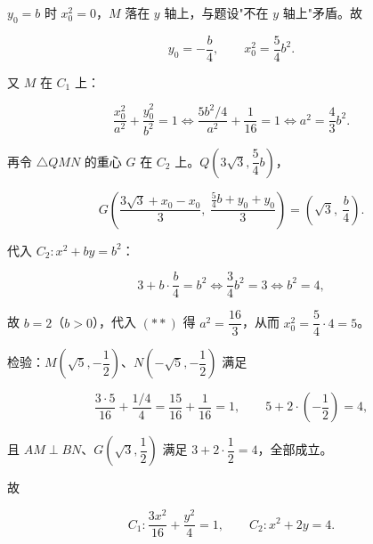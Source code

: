 \begin{answer}
$y_0=b$ 时 $x_0^2=0$，$M$ 落在 $y$ 轴上，与题设"不在 $y$ 轴上"矛盾。故

\nopagebreak[4]
\[y_0=-\frac b4,\qquad x_0^2=\frac54b^2.\]

又 $M$ 在 $C_1$ 上：

\nopagebreak[4]
\[\frac{x_0^2}{a^2}+\frac{y_0^2}{b^2}=1
\iff \frac{5b^2/4}{a^2}+\frac1{16}=1
\iff a^2=\frac43b^2.\tag{$**$}\]

再令 $\triangle QMN$ 的重心 $G$ 在 $C_2$ 上。$Q\left(3\sqrt3,\dfrac54b\right)$，

\nopagebreak[4]
\[G\left(\frac{3\sqrt3+x_0-x_0}3,\ \frac{\frac54b+y_0+y_0}3\right)
=\left(\sqrt3,\ \frac b4\right).\]

代入 $C_2:x^2+by=b^2$：

\nopagebreak[4]
\[3+b\cdot\frac b4=b^2\iff \frac34b^2=3\iff b^2=4,\]

故 $b=2$（$b>0$），代入 $(**)$ 得 $a^2=\dfrac{16}3$，从而 $x_0^2=\dfrac54\cdot4=5$。

检验：$M\left(\sqrt5,-\dfrac12\right)$、$N\left(-\sqrt5,-\dfrac12\right)$ 满足

\nopagebreak[4]
\[\frac{3\cdot5}{16}+\frac{1/4}{4}=\frac{15}{16}+\frac1{16}=1,\qquad
5+2\cdot\left(-\frac12\right)=4,\]

且 $AM\perp BN$、$G\left(\sqrt3,\dfrac12\right)$ 满足 $3+2\cdot\dfrac12=4$，全部成立。

故

\nopagebreak[4]
\[C_1:\frac{3x^2}{16}+\frac{y^2}{4}=1,\qquad C_2:x^2+2y=4.\]


\end{answer}
